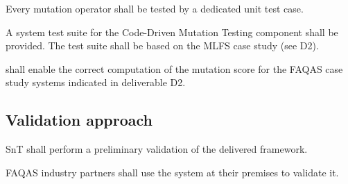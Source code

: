 \RQ{} Every mutation operator shall be tested by a dedicated unit test case.
 
 \RQ{} A system test suite for the Code-Driven Mutation Testing component shall be provided. The test suite shall be based on the MLFS case study (see D2).
 
 \RQ{} \FAQAS shall enable the correct computation of the mutation score for the FAQAS case study systems indicated in deliverable D2.
 
 \subsection{Validation approach}

\RQ{} SnT shall perform a preliminary validation of the delivered framework.

\RQ{} FAQAS industry partners shall use the system at their premises to validate it.

